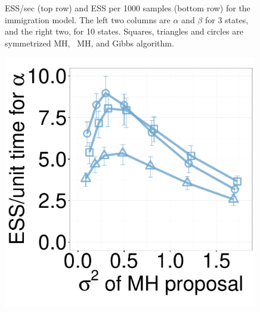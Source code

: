 \begin{figure}[H]
\begin{minipage}[hp]{0.24\linewidth}
	\end{minipage}
    \caption{ESS/sec (top row) and ESS per 1000 samples (bottom row) for the immigration model. The left two columns are $\alpha$ and $\beta$ for 3 states, and the right two, for 10 states.
    Squares, triangles and circles are symmetrized MH, \naive\ MH, and Gibbs algorithm. }
     \label{fig:ESS_Q_D10}
  \end{figure}

  \begin{figure}[H]
  \centering
  \begin{minipage}[!hp]{0.24\linewidth}
  \centering
    \includegraphics [width=0.99\textwidth, angle=0]{figs/new_whole_exp_figs/mh_q_alpha_dim3.pdf}
\end{minipage}
  \begin{minipage}[hp]{0.24\linewidth}
  \centering

\end{minipage}
\end{figure}
